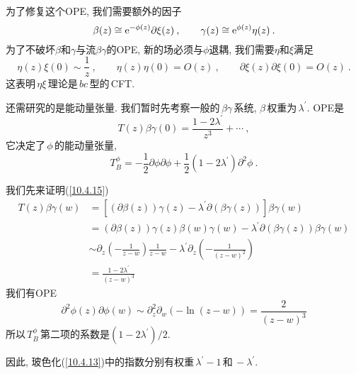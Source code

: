 为了修复这个OPE, 我们需要额外的因子
\begin{equation}
    \beta(z)\cong \mathrm{e}^{-\phi(z)} \partial\xi(z) \:, \qquad \gamma(z)\cong\mathrm{e}^{\phi(z)}\eta(z)\:. \label{10.4.13}
\end{equation}
为了不破坏$\beta$和$\gamma$与流$\beta\gamma$的OPE, 新的场必须与$\phi$退耦, 我们需要$\eta$和$\xi$满足
\begin{equation}
    \eta(z)\xi(0) \sim \frac{1}{z} \:, \qquad 
    \eta(z)\eta(0) = O(z) \:, \qquad 
    \partial\xi(z)\partial\xi(0) =O(z) \:. \label{10.4.14}
\end{equation}
这表明$\,\eta\xi\,$理论是$\,bc\,$型的\,CFT.

还需研究的是能动量张量. 我们暂时先考察一般的$\,\beta\gamma\,$系统, $\beta\,$权重为$\,\lambda^{\prime}$. OPE是
\begin{equation}
    T(z)\beta\gamma(0) = \frac{1-2\lambda^{\prime}}{z^{3}}+\cdots \:, \label{10.4.15}
\end{equation}
它决定了$\,\phi\,$的能动量张量,
\begin{equation}
    T_{B}^{\phi}=-\frac{1}{2}\partial\phi \partial\phi +\frac{1}{2}(1-2\lambda^{\prime})\partial^{2}\phi\:. \label{10.4.16}
\end{equation}
\begin{tcolorbox}
我们先来证明(\ref{10.4.15})
\begin{align*}
T(z)\beta \gamma (w) &=[(\partial \beta (z))\gamma (z)-\lambda ^{\prime
}\partial (\beta \gamma (z))]\beta \gamma (w) \\
&=(\partial \beta (z))\gamma (z)\beta (w)\gamma (w)-\lambda ^{\prime
}\partial (\beta \gamma (z))\beta \gamma (w) \\
&\sim \partial _{z}(-\frac{1}{z-w})\frac{1}{z-w}-\lambda ^{\prime }\partial
_{z}\left( -\frac{1}{(z-w)^{2}}\right)  \\
&=\frac{1-2\lambda ^{\prime }}{(z-w)^{3}}
\end{align*}%
我们有OPE%
\[
\partial ^{2}\phi (z)\partial \phi (w)\sim \partial _{z}^{2}\partial
_{w}(-\ln (z-w))=\frac{2}{(z-w)^{3}}
\]%
所以$\,T_{B}^{\phi}\,$第二项的系数是$(1-2\lambda ^{\prime })/2$.
\end{tcolorbox}
\noindent 因此, 玻色化(\ref{10.4.13})中的指数分别有权重$\,\lambda^{\prime}-1\,$和$\,-\lambda^{\prime}$.
